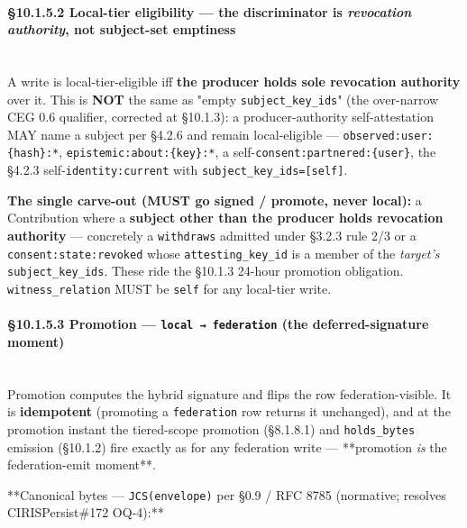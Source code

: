 \documentclass[11pt]{article}
\begin{document}
\paragraph{§10.1.5.2 Local-tier eligibility — the discriminator is \textit{revocation authority}, not subject-set emptiness}\mbox{}\\


A write is local-tier-eligible iff \textbf{the producer holds sole revocation authority} over it. This is \textbf{NOT} the same as "empty \texttt{subject\_key\_ids}" (the over-narrow CEG 0.6 qualifier, corrected at §10.1.3): a producer-authority self-attestation MAY name a subject per §4.2.6 and remain local-eligible — \texttt{observed:user:\{hash\}:*}, \texttt{epistemic:about:\{key\}:*}, a self-\texttt{consent:partnered:\{user\}}, the §4.2.3 self-\texttt{identity:current} with \texttt{subject\_key\_ids=[self]}.


\textbf{The single carve-out (MUST go signed / promote, never local):} a Contribution where a \textbf{subject other than the producer holds revocation authority} — concretely a \texttt{withdraws} admitted under §3.2.3 rule 2/3 or a \texttt{consent:state:revoked} whose \texttt{attesting\_key\_id} is a member of the \textit{target's} \texttt{subject\_key\_ids}. These ride the §10.1.3 24-hour promotion obligation. \texttt{witness\_relation} MUST be \texttt{self} for any local-tier write.


\paragraph{§10.1.5.3 Promotion — \texttt{local → federation} (the deferred-signature moment)}\mbox{}\\


Promotion computes the hybrid signature and flips the row federation-visible. It is \textbf{idempotent} (promoting a \texttt{federation} row returns it unchanged), and at the promotion instant the tiered-scope promotion (§8.1.8.1) and \texttt{holds\_bytes} emission (§10.1.2) fire exactly as for any federation write — **promotion \textit{is} the federation-emit moment**.


**Canonical bytes — \texttt{JCS(envelope)} per §0.9 / RFC 8785 (normative; resolves CIRISPersist\#172 OQ-4):**
\end{document}
